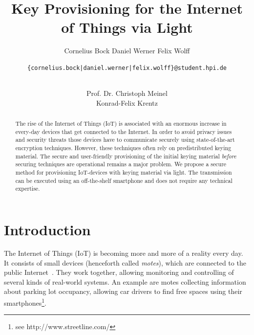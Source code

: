 \documentclass{sig-alternate} %
\begin{document}
\title{Key Provisioning for the Internet of Things via Light}


\author{
\alignauthor
Cornelius Bock
%
\alignauthor
Daniel Werner
%
\alignauthor
Felix Wolff
%
\and
\texttt{\{cornelius.bock|daniel.werner|felix.wolff\}@student.hpi.de} \\ \\
\and
\alignauthor
Prof. Dr. Christoph Meinel\\
%
\alignauthor
Konrad-Felix Krentz\\
}
\toappear{}
\maketitle

\begin{abstract}
The rise of the Internet of Things (IoT) is associated with an enormous increase in every-day devices that get connected to the Internet.
In order to avoid privacy issues and security threats those devices have to communicate securely using state-of-the-art encryption techniques.
However, these techniques often rely on predistributed keying material.
The secure and user-friendly provisioning of the initial keying material \textit{before} securing techniques are operational remains a major problem.
We propose a secure method for provisioning IoT-devices with keying material via light.
The transmission can be executed using an off-the-shelf smartphone and does not require any technical expertise.
\end{abstract}



\section{Introduction}
\label{sec:introduction}

The Internet of Things (IoT) is becoming more and more of a reality every day.
It consists of small devices (henceforth called \textit{motes}), which are connected to the public Internet~\cite{atzori2010internet}.
They work together, allowing monitoring and controlling of several kinds of real-world systems.
An example are motes collecting information about parking lot occupancy, allowing car drivers to find free spaces using their smartphones\footnote{see http://www.streetline.com/}.
\end{document}
